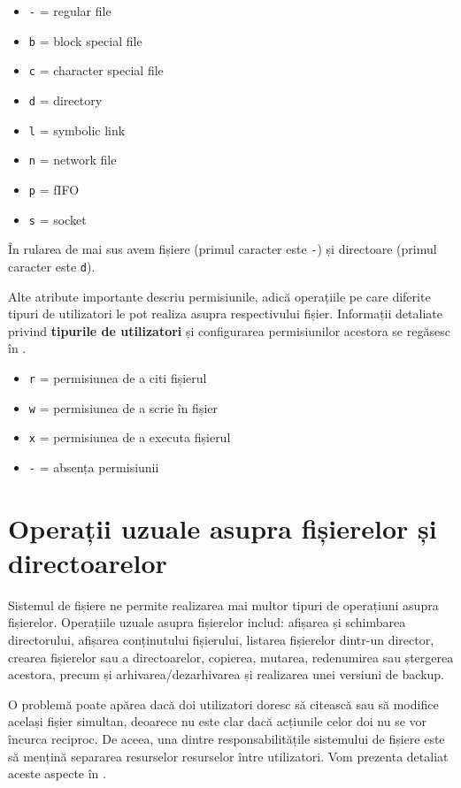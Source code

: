 \begin{itemize}
	\item \texttt{-} = regular file
	\item \texttt{b} = block special file
	\item \texttt{c} = character special file
	\item \texttt{d} = directory
	\item \texttt{l} = symbolic link
	\item \texttt{n} = network file
	\item \texttt{p} = fIFO
	\item \texttt{s} = socket
\end{itemize}

În rularea de mai sus avem fișiere (primul caracter este \texttt{-}) și directoare (primul caracter este \texttt{d}).

Alte atribute importante descriu permisiunile, adică operațiile pe care diferite
tipuri de utilizatori le pot realiza asupra respectivului fișier. Informații
detaliate privind \textbf{tipurile de utilizatori} și configurarea permisiunilor
acestora se regăsesc în .

\begin{itemize}
	\item \texttt{r} = permisiunea de a citi fișierul
	\item \texttt{w} = permisiunea de a scrie în fișier
	\item \texttt{x} = permisiunea de a executa fișierul
	\item \texttt{-} = absența permisiunii
\end{itemize}

\section{Operații uzuale asupra fișierelor și directoarelor}
\label{sec:file-system-file-ops}

Sistemul de fișiere ne permite realizarea mai multor tipuri de operațiuni asupra
fișierelor. Operațiile uzuale asupra fișierelor includ: afișarea și
schimbarea directorului, afișarea conținutului fișierului, listarea fișierelor
dintr-un director, crearea fișierelor sau a directoarelor, copierea, mutarea,
redenumirea sau ștergerea acestora, precum și arhivarea/dezarhivarea și
realizarea unei versiuni de backup.

O problemă poate apărea dacă doi utilizatori doresc să citească sau să modifice
același fișier simultan, deoarece nu este clar dacă acțiunile celor doi nu se
vor încurca reciproc. De aceea, una dintre responsabilitățile sistemului de
fișiere este să mențină separarea resurselor resurselor între utilizatori. Vom prezenta detaliat aceste aspecte în .


